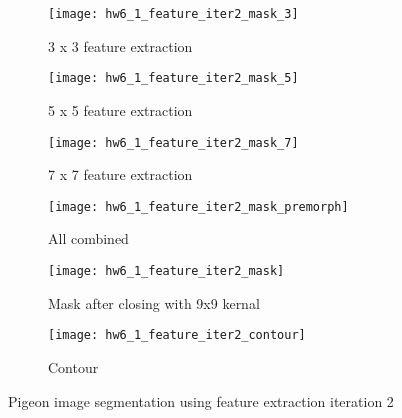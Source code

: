 \documentclass[11pt]{article}
\begin{document}
\begin{figure}[H]
\begin{subfigure}{.5\textwidth}
  \centering
  \texttt{[image: hw6\_1\_feature\_iter2\_mask\_3]}
  \caption{3 x 3 feature extraction}
  \label{}
\end{subfigure}
\begin{subfigure}{.5\textwidth}
  \centering
  \texttt{[image: hw6\_1\_feature\_iter2\_mask\_5]}
  \caption{5 x 5 feature extraction}
  \label{}
\end{subfigure}

\begin{subfigure}{.5\textwidth}
  \centering
  \texttt{[image: hw6\_1\_feature\_iter2\_mask\_7]}
  \caption{7 x 7 feature extraction}
  \label{}
\end{subfigure}
\begin{subfigure}{.5\textwidth}
  \centering
  \texttt{[image: hw6\_1\_feature\_iter2\_mask\_premorph]}
  \caption{All combined}
  \label{}
\end{subfigure}

\begin{subfigure}{.5\textwidth}
  \centering
  \texttt{[image: hw6\_1\_feature\_iter2\_mask]}
  \caption{Mask after closing with 9x9 kernal}
  \label{}
\end{subfigure}
\begin{subfigure}{.5\textwidth}
  \centering
  \texttt{[image: hw6\_1\_feature\_iter2\_contour]}
  \caption{Contour}
  \label{}
\end{subfigure}

\caption{Pigeon image segmentation using feature extraction iteration 2}
\label{}
\end{figure}
\end{document}
